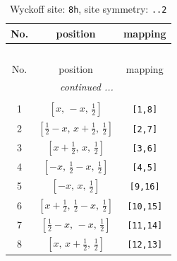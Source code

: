 \documentclass[fleqn,8pt]{jsarticle}
\begin{document}
\begin{longtable}{ccc}
\caption{Wyckoff site: {\tt 8h}, site symmetry: {\tt ..2}}
 \\
 \hline \hline
No. & position & mapping \\ \hline \endfirsthead

\multicolumn{2}{l}{\tablename\ \thetable{}} \\
 \hline \hline
No. & position & mapping \\ \hline \endhead

 \hline \hline
\multicolumn{2}{r}{\footnotesize\it continued ...} \\ \endfoot

 \hline \hline
\multicolumn{2}{r}{} \\ \endlastfoot

1 & $\left[ x,\, - x,\, \frac{1}{2} \right]$ & {\tt [1,8]} \\ \hline
2 & $\left[ \frac{1}{2} - x,\, x + \frac{1}{2},\, \frac{1}{2} \right]$ & {\tt [2,7]} \\ \hline
3 & $\left[ x + \frac{1}{2},\, x,\, \frac{1}{2} \right]$ & {\tt [3,6]} \\ \hline
4 & $\left[ - x,\, \frac{1}{2} - x,\, \frac{1}{2} \right]$ & {\tt [4,5]} \\ \hline
5 & $\left[ - x,\, x,\, \frac{1}{2} \right]$ & {\tt [9,16]} \\ \hline
6 & $\left[ x + \frac{1}{2},\, \frac{1}{2} - x,\, \frac{1}{2} \right]$ & {\tt [10,15]} \\ \hline
7 & $\left[ \frac{1}{2} - x,\, - x,\, \frac{1}{2} \right]$ & {\tt [11,14]} \\ \hline
8 & $\left[ x,\, x + \frac{1}{2},\, \frac{1}{2} \right]$ & {\tt [12,13]} \\
\end{longtable}
\renewcommand{\arraystretch}{1.2}
\end{document}
